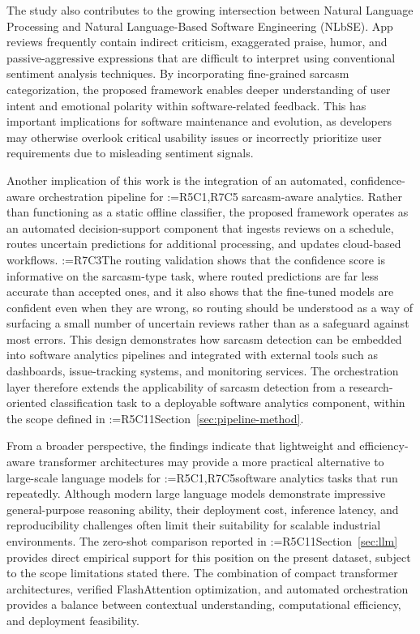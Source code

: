 \documentclass[a4paper,fleqn]{cas-sc}
\makeatletter
\newif\iftracked
\newcommand{\rv@setcolour}[1]{%
  \IfStrEq{#1}{R7C7}{\color{rvEdit}}{%
    \IfSubStr{#1}{R5}{\IfSubStr{#1}{R7}{\color{rvBoth}}{\color{rvFive}}}{\color{rvSeven}}}}
\newcommand{\rv@tag}[1]{\textsuperscript{\sffamily\bfseries\scriptsize[\StrSubstitute{#1}{,}{, }]}\,}
\newcommand{\rv@recordone}[1]{%
  \edef\rv@i{#1}%
  \ifcsdef{rv@n@\rv@i}{}{\csgdef{rv@n@\rv@i}{0}}%
  \csxdef{rv@n@\rv@i}{\the\numexpr\csuse{rv@n@\rv@i}+1\relax}%
  \begingroup\edef\@currentlabel{\rv@i}\label{rv:\rv@i:\csuse{rv@n@\rv@i}}\endgroup}
\newcommand{\rv@record}[1]{\@for\rv@id:=#1\do{\expandafter\rv@recordone\expandafter{\rv@id}}}
\DeclareRobustCommand{\rc}[2]{\rv@record{#1}\iftracked{\rv@setcolour{#1}\rv@tag{#1}#2}\else#2\fi}
\DeclareRobustCommand{\rcdel}[2]{\rv@record{#1}\iftracked{\rv@setcolour{#1}\rv@tag{#1}\rv@strike{#2}}\else\unskip\fi}
\DeclareRobustCommand{\rcrep}[3]{\rv@record{#1}\iftracked{\rv@setcolour{#1}\rv@tag{#1}\rv@strike{#2} #3}\else#3\fi}
\makeatother
\begin{document}
The study also contributes to the growing intersection between Natural Language Processing and Natural Language-Based Software Engineering (NLbSE). App reviews frequently contain indirect criticism, exaggerated praise, humor, and passive-aggressive expressions that are difficult to interpret using conventional sentiment analysis techniques. By incorporating fine-grained sarcasm categorization, the proposed framework enables deeper understanding of user intent and emotional polarity within software-related feedback. This has important implications for software maintenance and evolution, as developers may otherwise overlook critical usability issues or incorrectly prioritize user requirements due to misleading sentiment signals.

Another implication of this work is the integration of an automated, confidence-aware orchestration pipeline for \rcdel{R5C1,R7C5}{continuous} sarcasm-aware analytics. Rather than functioning as a static offline classifier, the proposed framework operates as an automated decision-support component that ingests reviews on a schedule, routes uncertain predictions for additional processing, and updates cloud-based workflows. \rc{R7C3}{The routing validation shows that the confidence score is informative on the sarcasm-type task, where routed predictions are far less accurate than accepted ones, and it also shows that the fine-tuned models are confident even when they are wrong, so routing should be understood as a way of surfacing a small number of uncertain reviews rather than as a safeguard against most errors.} This design demonstrates how sarcasm detection can be embedded into software analytics pipelines and integrated with external tools such as dashboards, issue-tracking systems, and monitoring services. The orchestration layer therefore extends the applicability of sarcasm detection from a research-oriented classification task to a deployable software analytics component, within the scope defined in \rcrep{R5C11}{Section 3.7}{Section~\ref{sec:pipeline-method}}.

From a broader perspective, the findings indicate that lightweight and efficiency-aware transformer architectures may provide a more practical alternative to large-scale language models for \rcrep{R5C1,R7C5}{continuous software analytics tasks}{software analytics tasks that run repeatedly}. Although modern large language models demonstrate impressive general-purpose reasoning ability, their deployment cost, inference latency, and reproducibility challenges often limit their suitability for scalable industrial environments. The zero-shot comparison reported in \rcrep{R5C11}{Section 6.2}{Section~\ref{sec:llm}} provides direct empirical support for this position on the present dataset, subject to the scope limitations stated there. The combination of compact transformer architectures, verified FlashAttention optimization, and automated orchestration provides a balance between contextual understanding, computational efficiency, and deployment feasibility.
\end{document}
